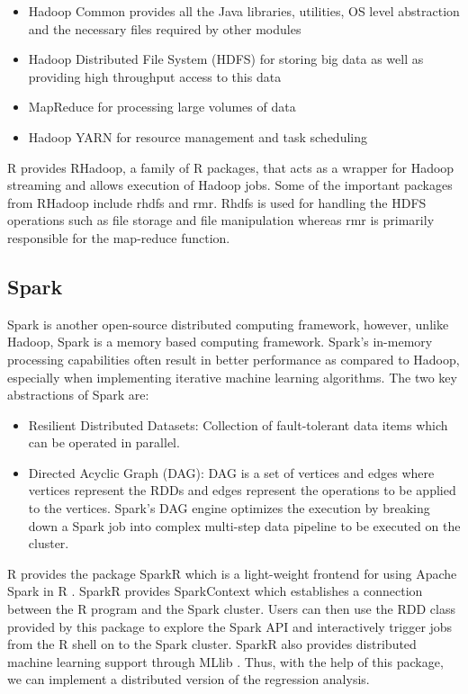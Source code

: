 \documentclass[sigconf]{acmart}
\begin{document}
\begin{itemize}
    \item Hadoop Common provides all the Java libraries, utilities, OS level abstraction and the necessary files required by other modules
    \item Hadoop Distributed File System (HDFS) for storing big data as well as providing high throughput access to this data
    \item MapReduce for processing large volumes of data
    \item Hadoop YARN for resource management and task scheduling
\end{itemize}

R provides RHadoop, a family of R packages, that acts as a wrapper for Hadoop streaming and allows execution of Hadoop jobs. Some of the important packages from RHadoop include rhdfs and rmr. Rhdfs is used for handling the HDFS operations such as file storage and file manipulation whereas rmr is primarily responsible for the map-reduce function.

\subsection{Spark} 
Spark is another open-source distributed computing framework, however, unlike Hadoop, Spark is a memory based computing framework. Spark's in-memory processing capabilities often result in better performance as compared to Hadoop, especially when implementing iterative machine learning algorithms. The two key abstractions of Spark are:

\begin{itemize}
    \item Resilient Distributed Datasets: Collection of fault-tolerant data items which can be operated in parallel.
    \item Directed Acyclic Graph (DAG): DAG is a set of vertices and edges where vertices represent the RDDs and edges represent the operations to be applied to the vertices. Spark's DAG engine optimizes the execution by breaking down a Spark job into complex multi-step data pipeline to be executed on the cluster.
\end{itemize}

R provides the package SparkR which is a light-weight frontend for using Apache Spark in R \cite{log-reg}. SparkR provides SparkContext which establishes a connection between the R program and the Spark cluster. Users can then use the RDD class provided by this package to explore the Spark API and interactively trigger jobs from the R shell on to the Spark cluster. SparkR also provides distributed machine learning support through MLlib \cite{log-reg}. Thus, with the help of this package, we can implement a distributed version of the regression analysis.
\end{document}

